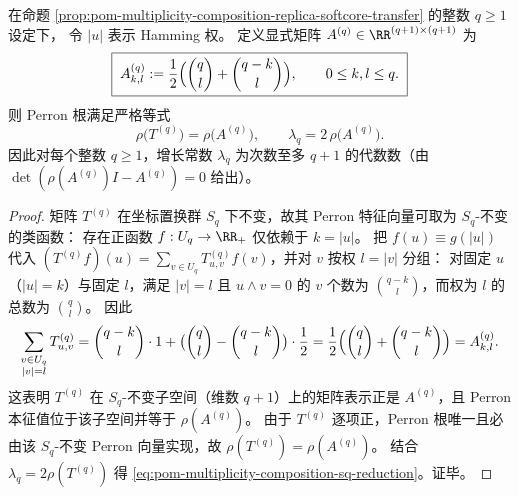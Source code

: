 \begin{proposition}\label{prop:pom-multiplicity-composition-sq-symmetry-reduction}
在命题 \ref{prop:pom-multiplicity-composition-replica-softcore-transfer} 的整数 \(q\ge 1\) 设定下，
令 \(|u|\) 表示 Hamming 权。
定义显式矩阵 \(A^{(q)}\in\RR^{(q+1)\times(q+1)}\) 为
\begin{equation}\label{eq:pom-multiplicity-composition-Aq-def}
\boxed{\;
A^{(q)}_{k,l}:=\frac12\Bigl(\binom{q}{l}+\binom{q-k}{l}\Bigr),
\qquad 0\le k,l\le q.\;}
\end{equation}
则 Perron 根满足严格等式
\begin{equation}\label{eq:pom-multiplicity-composition-sq-reduction}
\boxed{\;
\rho\!\bigl(T^{(q)}\bigr)=\rho\!\bigl(A^{(q)}\bigr),\qquad
\lambda_q=2\,\rho\!\bigl(A^{(q)}\bigr).\;}
\end{equation}
因此对每个整数 \(q\ge 1\)，增长常数 \(\lambda_q\) 为次数至多 \(q+1\) 的代数数（由 \(\det(\rho(A^{(q)})I-A^{(q)})=0\) 给出）。
\end{proposition}
\begin{proof}
矩阵 \(T^{(q)}\) 在坐标置换群 \(S_q\) 下不变，故其 Perron 特征向量可取为 \(S_q\)-不变的类函数：
存在正函数 \(f:U_q\to\RR_+\) 仅依赖于 \(k=|u|\)。
把 \(f(u)\equiv g(|u|)\) 代入 \((T^{(q)}f)(u)=\sum_{v\in U_q}T^{(q)}_{u,v}f(v)\)，并对 \(v\) 按权 \(l=|v|\) 分组：
对固定 \(u\)（\(|u|=k\)）与固定 \(l\)，满足 \(|v|=l\) 且 \(u\wedge v=0\) 的 \(v\) 个数为 \(\binom{q-k}{l}\)，而权为 \(l\) 的总数为 \(\binom{q}{l}\)。
因此
\[
\sum_{\substack{v\in U_q\\ |v|=l}}T^{(q)}_{u,v}
=\binom{q-k}{l}\cdot 1 + \bigl(\binom{q}{l}-\binom{q-k}{l}\bigr)\cdot \frac12
=\frac12\Bigl(\binom{q}{l}+\binom{q-k}{l}\Bigr)
=A^{(q)}_{k,l}.
\]
这表明 \(T^{(q)}\) 在 \(S_q\)-不变子空间（维数 \(q+1\)）上的矩阵表示正是 \(A^{(q)}\)，且 Perron 本征值位于该子空间并等于 \(\rho(A^{(q)})\)。
由于 \(T^{(q)}\) 逐项正，Perron 根唯一且必由该 \(S_q\)-不变 Perron 向量实现，故 \(\rho(T^{(q)})=\rho(A^{(q)})\)。
结合 \(\lambda_q=2\rho(T^{(q)})\) 得 \eqref{eq:pom-multiplicity-composition-sq-reduction}。证毕。
\end{proof}

